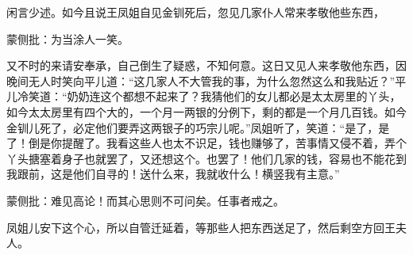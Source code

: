 \begin{parag}


    闲言少述。如今且说王凤姐自见金钏死后，忽见几家仆人常来孝敬他些东西，\begin{note}蒙侧批：为当涂人一笑。\end{note}又不时的来请安奉承，自己倒生了疑惑，不知何意。这日又见人来孝敬他东西，因晚间无人时笑向平儿道：“这几家人不大管我的事，为什么忽然这么和我贴近？”平儿冷笑道：“奶奶连这个都想不起来了？我猜他们的女儿都必是太太房里的丫头，如今太太房里有四个大的，一个月一两银的分例下，剩的都是一个月几百钱。如今金钏儿死了，必定他们要弄这两银子的巧宗儿呢。”凤姐听了，笑道：“是了，是了！倒是你提醒了。我看这些人也太不识足，钱也赚够了，苦事情又侵不着，弄个丫头搪塞着身子也就罢了，又还想这个。也罢了！他们几家的钱，容易也不能花到我跟前，这是他们自寻的！送什么来，我就收什么！横竖我有主意。”\begin{note}蒙侧批：难见高论！而其心思则不可问矣。任事者戒之。\end{note}凤姐儿安下这个心，所以自管迁延着，等那些人把东西送足了，然后剩空方回王夫人。
\end{parag}


